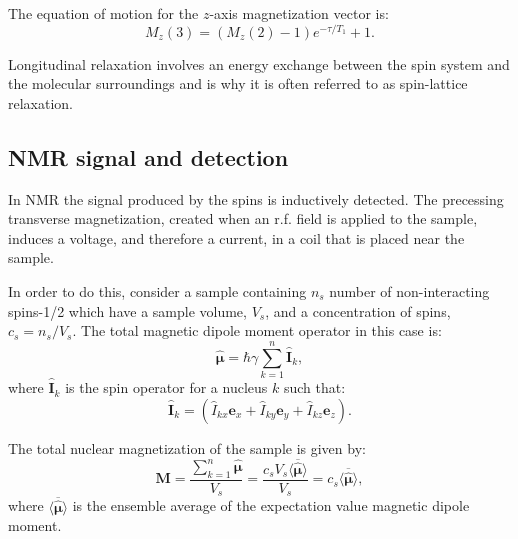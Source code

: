 The equation of motion for the $z$-axis magnetization vector is:
\begin{equation}
  M_z(3) = (M_z(2) - 1)e^{-\tau/T_1} + 1.
\end{equation}

Longitudinal relaxation involves an energy exchange between the spin system and the molecular
surroundings and is why it is often referred to as spin-lattice relaxation.

\subsection{NMR signal and detection}\label{Signal}

In NMR the signal produced by the spins is inductively detected. The precessing transverse magnetization, created
when an r.f. field is applied to the sample, induces a voltage, and therefore a current, in a coil that
is placed near the sample.

In order to do this, consider a sample containing $n_s$ number of non-interacting spins-1/2 which have a
sample volume, $V_s$, and a concentration of spins, $c_s = n_s/V_s$.
The total magnetic dipole moment operator in this case is:
\begin{equation}\label{eqn:MagneticMoment}
  \hat{\pmb{\mu}} = \hbar\gamma\sum_{k=1}^n\mathbf{\hat{I}}_k,
\end{equation}
where $\mathbf{\hat{I}}_k$ is the spin operator for a nucleus $k$ such that:
\begin{equation}
  \mathbf{\hat{I}}_k = (\hat{I}_{kx}\mathbf{e}_x + \hat{I}_{ky}\mathbf{e}_y + \hat{I}_{kz}\mathbf{e}_z).
\end{equation}

The total nuclear magnetization of the sample is given by:
\begin{equation}\label{eqn:magnetization}
  \mathbf{M} = \frac{\sum_{k=1}^n\hat{\pmb{\mu}}}{V_s} = \frac{c_sV_s\langle\overbar{\hat{\pmb{\mu}}}\rangle}{V_s} = c_s\langle\overbar{\hat{\pmb{\mu}}}\rangle,
\end{equation}
where $\langle\overbar{\hat{\pmb{\mu}}}\rangle$ is the ensemble average of the expectation value magnetic dipole moment.

